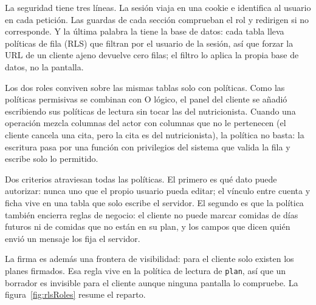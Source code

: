 La seguridad tiene tres líneas. La sesión viaja en una cookie e identifica al usuario en cada petición. Las guardas de cada sección comprueban el rol y redirigen si no corresponde. Y la última palabra la tiene la base de datos: cada tabla lleva políticas de fila (RLS) que filtran por el usuario de la sesión, así que forzar la URL de un cliente ajeno devuelve cero filas; el filtro lo aplica la propia base de datos, no la pantalla.

Los dos roles conviven sobre las mismas tablas solo con políticas. Como las políticas permisivas se combinan con O lógico, el panel del cliente se añadió escribiendo sus políticas de lectura sin tocar las del nutricionista. Cuando una operación mezcla columnas del actor con columnas que no le pertenecen (el cliente cancela una cita, pero la cita es del nutricionista), la política no basta: la escritura pasa por una función con privilegios del sistema que valida la fila y escribe solo lo permitido.

Dos criterios atraviesan todas las políticas. El primero es qué dato puede autorizar: nunca uno que el propio usuario pueda editar; el vínculo entre cuenta y ficha vive en una tabla que solo escribe el servidor. El segundo es que la política también encierra reglas de negocio: el cliente no puede marcar comidas de días futuros ni de comidas que no están en su plan, y los campos que dicen quién envió un mensaje los fija el servidor.

La firma es además una frontera de visibilidad: para el cliente solo existen los planes firmados. Esa regla vive en la política de lectura de \texttt{plan}, así que un borrador es invisible para el cliente aunque ninguna pantalla lo compruebe. La figura~\ref{fig:rlsRoles} resume el reparto.

